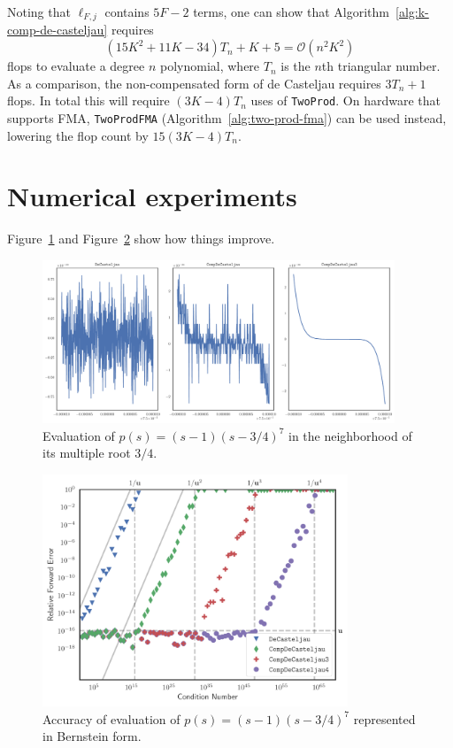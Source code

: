 \documentclass[letterpaper,10pt]{article}
\theoremstyle{definition}
\begin{document}
Noting that \(\ell_{F, j}\) contains \(5F - 2\) terms, one can
show that Algorithm~\ref{alg:k-comp-de-casteljau} requires
\begin{equation}
(15K^2 + 11K - 34)T_n + K + 5 =
\mathcal{O}\left(n^2 K^2\right)
\end{equation}
flops to evaluate a degree \(n\) polynomial, where \(T_n\) is the
\(n\)th triangular number. As a comparison, the non-compensated form of
de Casteljau requires \(3 T_n + 1\) flops. In total this will require
\((3K - 4)T_n\) uses of \texttt{TwoProd}. On hardware that supports
FMA, \texttt{TwoProdFMA} (Algorithm~\ref{alg:two-prod-fma}) can be used
instead, lowering the flop count by \(15(3K - 4)T_n\).

\section{Numerical experiments}\label{sec:numerical}

Figure~\ref{fig:smooth-drawing} and Figure~\ref{fig:compensated-k}
show how things improve.

\begin{figure}
  \includegraphics[width=0.9375\textwidth]{../images/de_casteljau_smooth_drawing.pdf}
  \centering
  \captionsetup{width=.75\linewidth}
  \caption{Evaluation of \(p(s) = (s - 1)\left(s - 3/4\right)^7\)
    in the neighborhood of its multiple root \(3/4\).}
  \label{fig:smooth-drawing}
\end{figure}

\begin{figure}
  \includegraphics[width=0.8125\textwidth]{../images/de_casteljau_rel_error.pdf}
  \centering
  \captionsetup{width=.75\linewidth}
  \caption{Accuracy of evaluation of \(p(s) = (s - 1)\left(s - 3/4\right)^7\)
    represented in Bernstein form.}
  \label{fig:compensated-k}
\end{figure}
\end{document}
